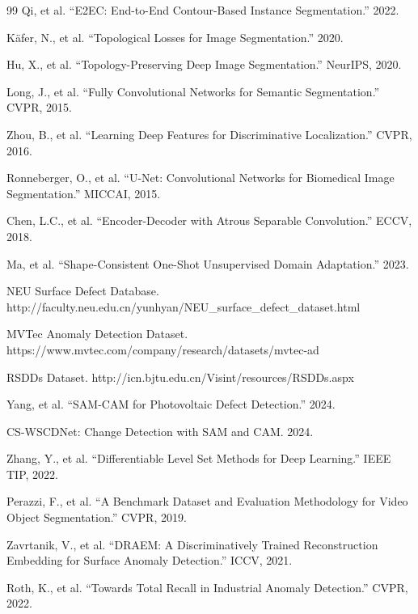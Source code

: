 \documentclass[12pt, a4paper]{article}
\begin{document}
\begin{thebibliography}{99}
Qi, et al. ``E2EC: End-to-End Contour-Based Instance Segmentation.'' 2022.

Käfer, N., et al. ``Topological Losses for Image Segmentation.'' 2020.

Hu, X., et al. ``Topology-Preserving Deep Image Segmentation.'' NeurIPS, 2020.

Long, J., et al. ``Fully Convolutional Networks for Semantic Segmentation.'' CVPR, 2015.

Zhou, B., et al. ``Learning Deep Features for Discriminative Localization.'' CVPR, 2016.

Ronneberger, O., et al. ``U-Net: Convolutional Networks for Biomedical Image Segmentation.'' MICCAI, 2015.

Chen, L.C., et al. ``Encoder-Decoder with Atrous Separable Convolution.'' ECCV, 2018.

Ma, et al. ``Shape-Consistent One-Shot Unsupervised Domain Adaptation.'' 2023.

NEU Surface Defect Database. http://faculty.neu.edu.cn/yunhyan/NEU\_surface\_defect\_dataset.html

MVTec Anomaly Detection Dataset. https://www.mvtec.com/company/research/datasets/mvtec-ad

RSDDs Dataset. http://icn.bjtu.edu.cn/Visint/resources/RSDDs.aspx

Yang, et al. ``SAM-CAM for Photovoltaic Defect Detection.'' 2024.

CS-WSCDNet: Change Detection with SAM and CAM. 2024.

Zhang, Y., et al. ``Differentiable Level Set Methods for Deep Learning.'' IEEE TIP, 2022.

Perazzi, F., et al. ``A Benchmark Dataset and Evaluation Methodology for Video Object Segmentation.'' CVPR, 2019.

Zavrtanik, V., et al. ``DRAEM: A Discriminatively Trained Reconstruction Embedding for Surface Anomaly Detection.'' ICCV, 2021.

Roth, K., et al. ``Towards Total Recall in Industrial Anomaly Detection.'' CVPR, 2022.

\end{thebibliography}
\end{document}
